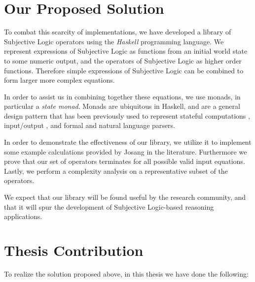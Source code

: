 \documentclass[thesis.tex]{subfiles}
\begin{document}
\section{Our Proposed Solution}

To combat this scarcity of implementations, we have developed a library of Subjective Logic
operators using the \emph{Haskell} programming language. We represent
expressions of Subjective Logic as functions from an initial world state to some
numeric output, and the operators of Subjective Logic as higher order functions.
Therefore simple expressions of Subjective Logic can be combined to form larger
more complex equations.

In order to assist us in combining together these equations, we use monads,
in particular a \emph{state monad}. Monads are ubiquitous in Haskell, and are
a general design pattern that has been previously used to represent stateful computations \cite{launchbury1994lazy},
input/output \cite{peyton1993imperative},
and formal \cite{hutton1998monadic, leijen2001parsec} and natural language
\cite{hafiz2010lazy} parsers.

In order to demonstrate the effectiveness of our library, we utilize it to implement some
example calculations provided by Josang in the literature. Furthermore we prove that our set of
operators terminates for all possible valid input equations.
Lastly, we perform a complexity analysis on a representative subset of the operators.

We expect that our library will be found useful by the research community, and that
it will spur the development of Subjective Logic-based reasoning applications.





\section{Thesis Contribution}

To realize the solution proposed above, in this thesis we have done the following:
\end{document}
